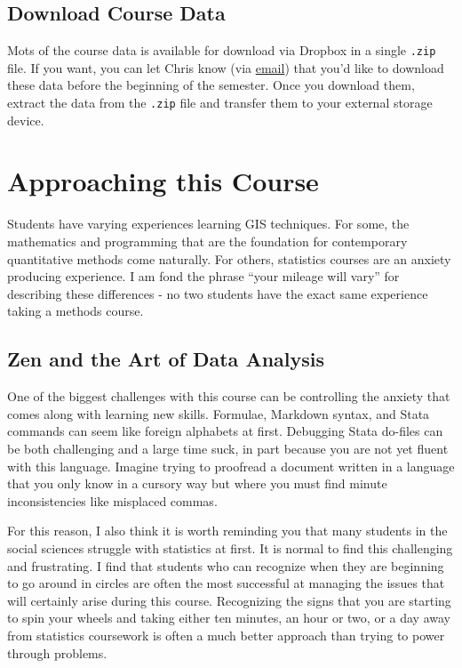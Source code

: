 \documentclass[]{book}
\begin{document}
\section{Download Course Data}\label{download-course-data}

Mots of the course data is available for download via Dropbox in a
single \texttt{.zip} file. If you want, you can let Chris know (via
\href{mailto:prenercg@slu.edu}{email}) that you'd like to download these
data before the beginning of the semester. Once you download them,
extract the data from the \texttt{.zip} file and transfer them to your
external storage device.

\chapter{Approaching this Course}\label{approaching-this-course}

Students have varying experiences learning GIS techniques. For some, the
mathematics and programming that are the foundation for contemporary
quantitative methods come naturally. For others, statistics courses are
an anxiety producing experience. I am fond the phrase ``your mileage
will vary'' for describing these differences - no two students have the
exact same experience taking a methods course.

\section{Zen and the Art of Data
Analysis}\label{zen-and-the-art-of-data-analysis}

One of the biggest challenges with this course can be controlling the
anxiety that comes along with learning new skills. Formulae, Markdown
syntax, and Stata commands can seem like foreign alphabets at first.
Debugging Stata do-files can be both challenging and a large time suck,
in part because you are not yet fluent with this language. Imagine
trying to proofread a document written in a language that you only know
in a cursory way but where you must find minute inconsistencies like
misplaced commas.

For this reason, I also think it is worth reminding you that many
students in the social sciences struggle with statistics at first. It is
normal to find this challenging and frustrating. I find that students
who can recognize when they are beginning to go around in circles are
often the most successful at managing the issues that will certainly
arise during this course. Recognizing the signs that you are starting to
spin your wheels and taking either ten minutes, an hour or two, or a day
away from statistics coursework is often a much better approach than
trying to power through problems.
\end{document}
